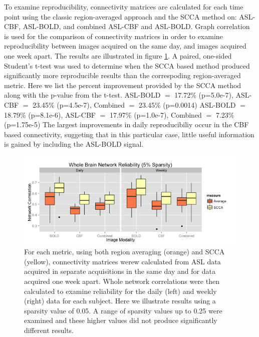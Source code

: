 \documentclass{llncs}
\begin{document}
 To examine reproducibility, connectivity matrices are calculated for each time point using the classic region-averaged approach and the SCCA method on: ASL-CBF, ASL-BOLD, and combined ASL-CBF and ASL-BOLD. Graph correlation \cite{vanWijk2010} is used for the comparison of connectivity matrices in order to examine reproducibility between images acquired on the same day, and images acquired one week apart. The results are illustrated in figure \ref{fig:testretest}. A paired, one-sided Student's t-test was used to determine when the SCCA based method produced significantly more reproducible results than the correspoding region-averaged metric. Here we list the percent improvement provided by the SCCA method along with the p-value from the t-test. \newline
{} ASL-BOLD $=$ 17.72\% (p=5.0e-7), ASL-CBF $=$ 23.45\% (p=4.5e-7), Combined $=$ 23.45\% (p=0.0014) \newline
{} ASL-BOLD $=$ 18.79\% (p=8.1e-6), ASL-CBF $=$ 17.97\% (p=1.0e-7), Combined $=$ 7.23\% (p=1.75e-5) \newline
The largest improvements in daily reproducibiliy occur in the CBF based connectivity, suggeting that in this particular case, little useful information is gained by including the ASL-BOLD signal.

\begin{figure}[tb]
\begin{center}
\includegraphics[width=0.8\linewidth]{retest.png} 
\caption{For each metric, using both region averaging (orange) and SCCA (yellow), connectivity matrices werew calculated from ASL data acquired in separate acquisitions in the same day and for data acquired one week apart. Whole network correlations were then calculated to examine reliability for the daily (left) and weekly (right) data for each subject. Here we illustrate results using a sparsity value of 0.05. A range of sparsity values up to 0.25 were examined and these higher values did not produce significantly different results.}
\label{fig:testretest}
\end{center}
\end{figure}
\end{document}
